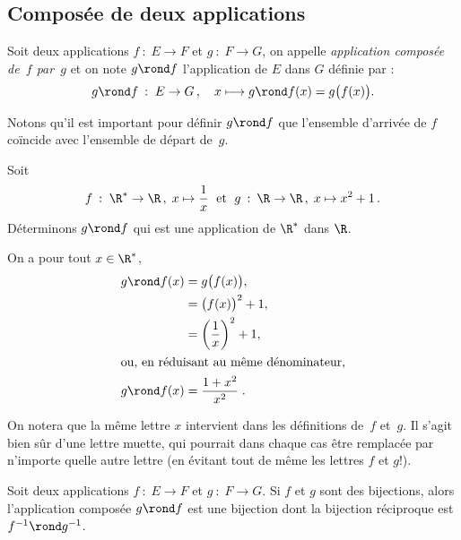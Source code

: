 \subsection{Composée de deux applications}

Soit deux applications $f\::\;E\to F$ et $g\::\;F\to G$, on appelle \emph{application composée de~$f$ par~$g$} et on note $g\rond f$ l'application de $E$ dans $G$ définie par :
\[g\rond f\::\; E\to G\,,\quad x\longmapsto g\rond f(x) = g\bigl(f(x)\bigr).\]

Notons qu'il est important pour définir $g\rond f$ que l'ensemble d'arrivée de $f$ coïncide avec l'ensemble de départ de~$g$.

\begin{example}
Soit 
\[
f\::\;\R^*\to\R\,,\; x\mapsto \frac1x\;\text{ et }\;g\::\:\R\to\R\,,\; x\mapsto x^2+1\,.
\]
Déterminons $g\rond f$ qui est une application de $\R^*$ dans $\R$.

On a pour tout $x\in\R^*$,
\begin{align*}
g\rond f(x) &= g\bigl(f(x)\bigr),\\
&={\bigl(f(x)\bigr)}^2+1,\\
&={\left(\frac1x\right)}^2+1,\\
\intertext{ou, en réduisant au même dénominateur,}
g\rond f(x)&= \frac{1+x^2}{x^2}\;.
\end{align*}
\begin{remark}
On notera que la même lettre $x$ intervient dans les définitions de~$f$ et~$g$. Il s'agit bien sûr d'une lettre muette, qui pourrait dans chaque cas être remplacée par n'importe quelle autre lettre (en évitant tout de même les lettres $f$ et $g$!).
\end{remark}
\end{example}

\begin{thm}Soit deux applications $f\::\;E\to F$ et $g\::\;F\to G$. Si $f$ et $g$ sont des bijections, alors l'application composée $g\rond f$ est une bijection dont la bijection réciproque est $f^{-1}\rond g^{-1}$. 
\end{thm}

